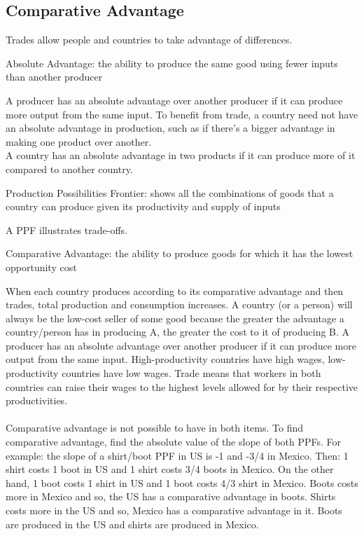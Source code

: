 \documentclass[12pt]{article}
\begin{document}
\subsection{Comparative Advantage} 
Trades allow people and countries to take advantage of differences. 
\begin{definition} Absolute Advantage: the ability to produce the same good using fewer inputs than another producer \end{definition} 
A producer has an absolute advantage over another producer if it can produce more output from the same input. To benefit from trade, a country need not have an absolute advantage in production, such as if there's a bigger advantage in making one product over another. \\ A country has an absolute advantage in two products if it can produce more of it compared to another country. 
\begin{definition} Production Possibilities Frontier: shows all the combinations of goods that a country can produce given its productivity and supply of inputs \end{definition} 
A PPF illustrates trade-offs. 
\begin{definition} Comparative Advantage: the ability to produce goods for which it has the lowest opportunity cost \end{definition}
When each country produces according to its comparative advantage and then trades, total production and consumption increases. A country (or a person) will always be the low-cost seller of some good because the greater the advantage a country/person has in producing A, the greater the cost to it of producing B. A producer has an absolute advantage over another producer if it can produce more output from the same input. High-productivity countries have high wages, low-productivity countries have low wages. Trade means that workers in both countries can raise their wages to the highest levels allowed for by their respective productivities. \\~\\ Comparative advantage is not possible to have in both items. \newpage
To find comparative advantage, find the absolute value of the slope of both PPFs. For example: the slope of a shirt/boot PPF in US is -1 and -3/4 in Mexico. Then: 1 shirt costs 1 boot in US and 1 shirt costs 3/4 boots in Mexico. On the other hand, 1 boot costs 1 shirt in US and 1 boot costs 4/3 shirt in Mexico. Boots costs more in Mexico and so, the US has a comparative advantage in boots. Shirts costs more in the US and so, Mexico has a comparative advantage in it. Boots are produced in the US and shirts are produced in Mexico. \\
\end{document}

